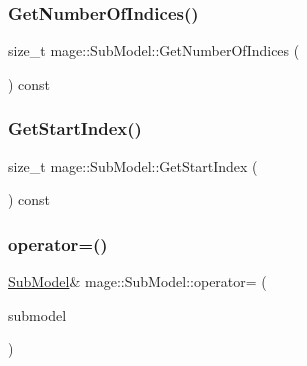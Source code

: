 \hypertarget{classmage_1_1_sub_model_a18736678fc1a5d882776298053e037b3}{}\label{classmage_1_1_sub_model_a18736678fc1a5d882776298053e037b3} 
\subsubsection{\texorpdfstring{Get\+Number\+Of\+Indices()}{GetNumberOfIndices()}}
{\footnotesize\ttfamily size\+\_\+t mage\+::\+Sub\+Model\+::\+Get\+Number\+Of\+Indices (\begin{DoxyParamCaption}{ }\end{DoxyParamCaption}) const}

\hypertarget{classmage_1_1_sub_model_a2b901cb62dca26a7ff399719e0a4ba66}{}\label{classmage_1_1_sub_model_a2b901cb62dca26a7ff399719e0a4ba66} 
\subsubsection{\texorpdfstring{Get\+Start\+Index()}{GetStartIndex()}}
{\footnotesize\ttfamily size\+\_\+t mage\+::\+Sub\+Model\+::\+Get\+Start\+Index (\begin{DoxyParamCaption}{ }\end{DoxyParamCaption}) const}

\hypertarget{classmage_1_1_sub_model_aafc8b4ba509ec78ea36719e98b1a0c99}{}\label{classmage_1_1_sub_model_aafc8b4ba509ec78ea36719e98b1a0c99} 
\subsubsection{\texorpdfstring{operator=()}{operator=()}\hspace{0.1cm}{\footnotesize\ttfamily [1/2]}}
{\footnotesize\ttfamily \hyperlink{classmage_1_1_sub_model}{Sub\+Model}\& mage\+::\+Sub\+Model\+::operator= (\begin{DoxyParamCaption}\item[{const \hyperlink{classmage_1_1_sub_model}{Sub\+Model} \&}]{submodel }\end{DoxyParamCaption})\hspace{0.3cm}{\ttfamily [delete]}}

